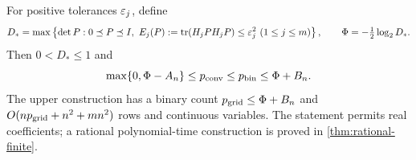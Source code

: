 \begin{theorem}\label{thm:finite-covariance}
For positive tolerances $\varepsilon_j$, define
\begin{equation}\label{eq:finite-determinant}
 D_* =\max\left\{\det P:0\preceq P\preceq I,
   \ E_j(P):=\operatorname{tr}(H_jPH_jP)\le\varepsilon_j^2\ (1\le j\le m)\right\},
 \qquad \Phi=-\tfrac12\log_2D_*.
\end{equation}
Then $0<D_*\le1$ and
\begin{equation}\label{eq:finite-law}
 \max\{0,\Phi-A_n\}\le p_{\mathrm{conv}}\le p_{\mathrm{bin}}\le\Phi+B_n.
\end{equation}
The upper construction has a binary count $p_{\rm grid}\le\Phi+B_n$
and $O(np_{\rm grid}+n^2+mn^2)$ rows and continuous variables.
The statement permits real coefficients; a rational polynomial-time
construction is proved in \cref{thm:rational-finite}.
\end{theorem}
